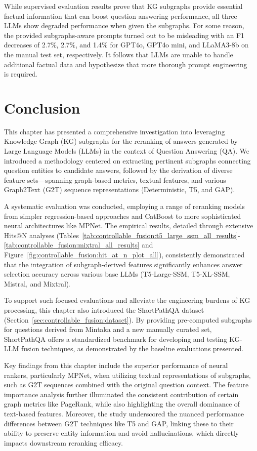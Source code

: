 While supervised evaluation results prove that KG subgraphs provide essential factual information that can boost question answering performance, all three LLMs show degraded performance when given the subgraphs. For some reason, the provided subgraphs-aware prompts turned out to be misleading with an F1 decreases of 2.7\%, 2.7\%, and 1.4\% for GPT4o, GPT4o mini, and LLaMA3-8b on the manual test set, respectively. It follows that LLMs are unable to handle additional factual data and hypothesize that more thorough prompt engineering is required.
    
    

\section{Conclusion}
\label{sec:controllable_fusion:chapter_conclusion}

This chapter has presented a comprehensive investigation into leveraging Knowledge Graph (KG) subgraphs for the reranking of answers generated by Large Language Models (LLMs) in the context of Question Answering (QA). We introduced a methodology centered on extracting pertinent subgraphs connecting question entities to candidate answers, followed by the derivation of diverse feature sets—spanning graph-based metrics, textual features, and various Graph2Text (G2T) sequence representations (Deterministic, T5, and GAP).

A systematic evaluation was conducted, employing a range of reranking models from simpler regression-based approaches and CatBoost to more sophisticated neural architectures like MPNet. The empirical results, detailed through extensive Hits@N analyses (Tables~\ref{tab:controllable_fusion:t5_large_ssm_all_results}-\ref{tab:controllable_fusion:mixtral_all_results} and Figure~\ref{fig:controllable_fusion:hit_at_n_plot_all}), consistently demonstrated that the integration of subgraph-derived features significantly enhances answer selection accuracy across various base LLMs (T5-Large-SSM, T5-XL-SSM, Mistral, and Mixtral).

To support such focused evaluations and alleviate the engineering burdens of KG processing, this chapter also introduced the ShortPathQA dataset (Section~\ref{sec:controllable_fusion:dataset}). By providing pre-computed subgraphs for questions derived from Mintaka and a new manually curated set, ShortPathQA offers a standardized benchmark for developing and testing KG-LLM fusion techniques, as demonstrated by the baseline evaluations presented.

Key findings from this chapter include the superior performance of neural rankers, particularly MPNet, when utilizing textual representations of subgraphs, such as G2T sequences combined with the original question context. The feature importance analysis further illuminated the consistent contribution of certain graph metrics like PageRank, while also highlighting the overall dominance of text-based features. Moreover, the study underscored the nuanced performance differences between G2T techniques like T5 and GAP, linking these to their ability to preserve entity information and avoid hallucinations, which directly impacts downstream reranking efficacy.